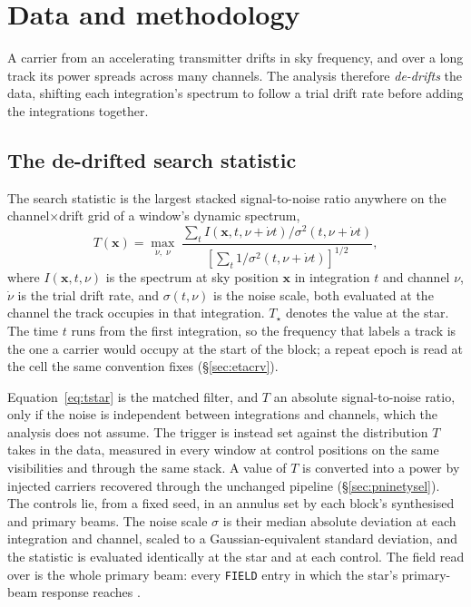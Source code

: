 \section{Data and methodology}
\label{sec:method}

A carrier from an accelerating transmitter drifts in sky frequency, and over
a long track its power spreads across many channels. The analysis therefore
\emph{de-drifts} the data, shifting each integration's spectrum to follow a
trial drift rate before adding the integrations together.

\subsection{The de-drifted search statistic}
\label{sec:statistic}

The search statistic is the largest stacked signal-to-noise ratio anywhere on
the channel$\times$drift grid of a window's dynamic spectrum,
%
\begin{equation}
T(\mathbf{x})=\max_{\dot\nu,\;\nu}\;
\frac{\sum_{t} I\!\left(\mathbf{x},t,\nu+\dot\nu t\right)
       \big/\sigma^{2}(t,\nu+\dot\nu t)}
     {\left[\sum_{t}1\big/\sigma^{2}(t,\nu+\dot\nu t)\right]^{1/2}},
\label{eq:tstar}
\end{equation}
%
where $I(\mathbf{x},t,\nu)$ is the spectrum at sky position $\mathbf{x}$ in
integration $t$ and channel $\nu$, $\dot\nu$ is the trial drift rate, and
$\sigma(t,\nu)$ is the noise scale, both evaluated at the channel the track
occupies in that integration. $T_\star$ denotes the value at the star. The
time $t$ runs from the first integration, so the frequency that labels a track
is the one a carrier would occupy at the start of the block; a repeat epoch is
read at the cell the same convention fixes (\S\ref{sec:etacrv}).

Equation~\ref{eq:tstar} is the matched filter, and $T$ an absolute
signal-to-noise ratio, only if the noise is independent between integrations
and channels, which the analysis does not assume. The trigger is instead set
against the distribution $T$ takes in the data, measured in every window at
\NCtrl{} control positions on the same visibilities and through the same
stack. A value of $T$ is converted into a power by injected carriers recovered
through the unchanged pipeline (\S\ref{sec:pninetysel}). The controls lie,
from a fixed seed, in an annulus set by each block's synthesised and primary
beams. The noise scale $\sigma$ is their median absolute deviation at each
integration and channel, scaled to a Gaussian-equivalent standard deviation,
and the statistic is evaluated identically at the star and at each control.
The field read over is the whole primary beam: every \texttt{FIELD} entry in
which the star's primary-beam response reaches \BgFieldMinResp.

